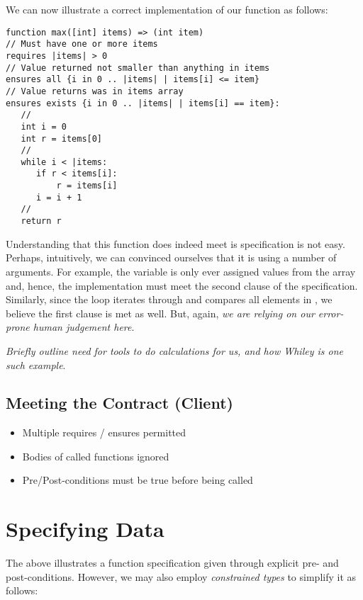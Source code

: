 \begin{eg} We can now illustrate a correct implementation of our  function as follows:

\begin{lstlisting}
function max([int] items) => (int item) 
// Must have one or more items
requires |items| > 0
// Value returned not smaller than anything in items
ensures all {i in 0 .. |items| | items[i] <= item}
// Value returns was in items array
ensures exists {i in 0 .. |items| | items[i] == item}:
   //
   int i = 0
   int r = items[0]
   //
   while i < |items:
      if r < items[i]:
          r = items[i]
      i = i + 1
   //
   return r
\end{lstlisting}

Understanding that this function does indeed meet is specification is not easy.  Perhaps, intuitively, we can convinced ourselves that it is using a number of arguments.  For example, the variable  is only ever assigned values from the  array and, hence, the implementation must meet the second  clause of the specification.  Similarly, since the loop iterates through and compares all elements in , we believe the first  clause is met as well.  But, again, {\em we are relying on our error-prone human judgement here}.  
\end{eg}

{\em Briefly outline need for tools to do calculations for us, and how Whiley is one such example}.

\subsection{Meeting the Contract (Client)}

\begin{itemize}

\item Multiple requires / ensures permitted
\item Bodies of called functions ignored
\item Pre/Post-conditions must be true before being called
\end{itemize}

\section{Specifying Data}

The above illustrates a function specification given through explicit pre- and
post-conditions.  However, we may also employ {\em constrained types}
to simplify it as follows:

